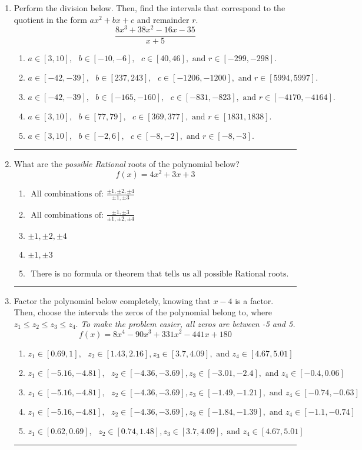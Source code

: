 \documentclass[14pt]{extbook}
\newcommand{\litem}[1]{\item#1\hspace*{-1cm}\rule{\textwidth}{0.4pt}}
\begin{document}
\begin{enumerate}
{\begin{enumerate}[label=\Alph*.]
\end{enumerate} }
\litem{
Perform the division below. Then, find the intervals that correspond to the quotient in the form $ax^2+bx+c$ and remainder $r$.\[ \frac{8x^{3} +38 x^{2} -16 x -35}{x + 5} \]\begin{enumerate}[label=\Alph*.]
\item \( a \in [3, 10], \text{   } b \in [-10, -6], \text{   } c \in [40, 46], \text{   and   } r \in [-299, -298]. \)
\item \( a \in [-42, -39], \text{   } b \in [237, 243], \text{   } c \in [-1206, -1200], \text{   and   } r \in [5994, 5997]. \)
\item \( a \in [-42, -39], \text{   } b \in [-165, -160], \text{   } c \in [-831, -823], \text{   and   } r \in [-4170, -4164]. \)
\item \( a \in [3, 10], \text{   } b \in [77, 79], \text{   } c \in [369, 377], \text{   and   } r \in [1831, 1838]. \)
\item \( a \in [3, 10], \text{   } b \in [-2, 6], \text{   } c \in [-8, -2], \text{   and   } r \in [-8, -3]. \)

\end{enumerate} }
\litem{
What are the \textit{possible Rational} roots of the polynomial below?\[ f(x) = 4x^{2} +3 x + 3 \]\begin{enumerate}[label=\Alph*.]
\item \( \text{ All combinations of: }\frac{\pm 1,\pm 2,\pm 4}{\pm 1,\pm 3} \)
\item \( \text{ All combinations of: }\frac{\pm 1,\pm 3}{\pm 1,\pm 2,\pm 4} \)
\item \( \pm 1,\pm 2,\pm 4 \)
\item \( \pm 1,\pm 3 \)
\item \( \text{ There is no formula or theorem that tells us all possible Rational roots.} \)

\end{enumerate} }
\litem{
Factor the polynomial below completely, knowing that $x-4$ is a factor. Then, choose the intervals the zeros of the polynomial belong to, where $z_1 \leq z_2 \leq z_3 \leq z_4$. \textit{To make the problem easier, all zeros are between -5 and 5.}\[ f(x) = 8x^{4} -90 x^{3} +331 x^{2} -441 x + 180 \]\begin{enumerate}[label=\Alph*.]
\item \( z_1 \in [0.69, 1], \text{   }  z_2 \in [1.43, 2.16], z_3 \in [3.7, 4.09], \text{   and   } z_4 \in [4.67, 5.01] \)
\item \( z_1 \in [-5.16, -4.81], \text{   }  z_2 \in [-4.36, -3.69], z_3 \in [-3.01, -2.4], \text{   and   } z_4 \in [-0.4, 0.06] \)
\item \( z_1 \in [-5.16, -4.81], \text{   }  z_2 \in [-4.36, -3.69], z_3 \in [-1.49, -1.21], \text{   and   } z_4 \in [-0.74, -0.63] \)
\item \( z_1 \in [-5.16, -4.81], \text{   }  z_2 \in [-4.36, -3.69], z_3 \in [-1.84, -1.39], \text{   and   } z_4 \in [-1.1, -0.74] \)
\item \( z_1 \in [0.62, 0.69], \text{   }  z_2 \in [0.74, 1.48], z_3 \in [3.7, 4.09], \text{   and   } z_4 \in [4.67, 5.01] \)


\end{enumerate}}
\end{enumerate}
\end{document}
